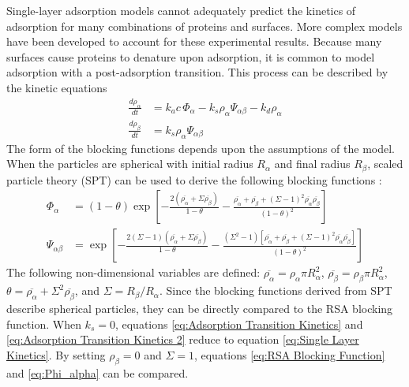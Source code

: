 Single-layer adsorption models cannot adequately predict the kinetics
of adsorption for many combinations of proteins and surfaces. More
complex models have been developed to account for these experimental
results. Because many surfaces cause proteins to denature upon adsorption,
it is common to model adsorption with a post-adsorption transition.
This process can be described by the kinetic equations\begin{align}
\frac{d\rho_{\alpha}}{dt} & =k_{a}c\,\Phi_{\alpha}-k_{s}\rho_{\alpha}\Psi_{\alpha\beta}-k_{d}\rho_{\alpha}\label{eq:Adsorption Transition Kinetics}\\
\frac{d\rho_{\beta}}{dt} & =k_{s}\rho_{\alpha}\Psi_{\alpha\beta}\label{eq:Adsorption Transition Kinetics 2}\end{align}
The form of the blocking functions depends upon the assumptions of
the model. When the particles are spherical with initial radius $R_{\alpha}$
and final radius $R_{\beta}$, scaled particle theory (SPT) can be
used to derive the following blocking functions \cite{Brusatori1999}:
\begin{align}
\Phi_{\alpha} & =\left(1-\theta\right)\exp\left[-\frac{2\left(\overline{\rho_{\alpha}}+\Sigma\overline{\rho_{\beta}}\right)}{1-\theta}-\frac{\overline{\rho_{\alpha}}+\overline{\rho_{\beta}}+\left(\Sigma-1\right)^{2}\overline{\rho_{\alpha}}\overline{\rho_{\beta}}}{\left(1-\theta\right)^{2}}\right]\label{eq:Phi_alpha}\\
\Psi_{\alpha\beta} & =\exp\left[-\frac{2\left(\Sigma-1\right)\left(\overline{\rho_{\alpha}}+\Sigma\overline{\rho_{\beta}}\right)}{1-\theta}-\frac{\left(\Sigma^{2}-1\right)\left[\overline{\rho_{\alpha}}+\overline{\rho_{\beta}}+\left(\Sigma-1\right)^{2}\overline{\rho_{\alpha}}\overline{\rho_{\beta}}\right]}{\left(1-\theta\right)^{2}}\right]\label{eq:Psi_alpha_beta}\end{align}
The following non-dimensional variables are defined: $\overline{\rho_{\alpha}}=\rho_{\alpha}\pi R_{\alpha}^{2}$,
$\overline{\rho_{\beta}}=\rho_{\beta}\pi R_{\alpha}^{2}$, $\theta=\overline{\rho_{\alpha}}+\Sigma^{2}\overline{\rho_{\beta}}$,
and $\Sigma=R_{\beta}/R_{\alpha}$. Since the blocking functions derived
from SPT describe spherical particles, they can be directly compared
to the RSA blocking function. When $k_{s}=0$, equations \ref{eq:Adsorption Transition Kinetics}
and \ref{eq:Adsorption Transition Kinetics 2} reduce to equation
\ref{eq:Single Layer Kinetics}. By setting $\rho_{\beta}=0$ and
$\Sigma=1$, equations \ref{eq:RSA Blocking Function} and \ref{eq:Phi_alpha}
can be compared.

